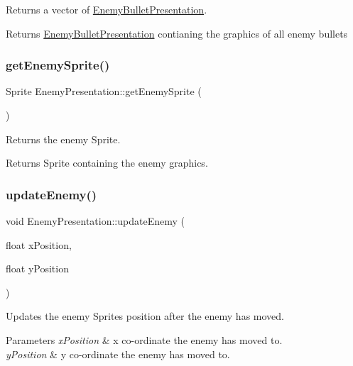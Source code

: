 Returns a vector of \hyperlink{class_enemy_bullet_presentation}{Enemy\+Bullet\+Presentation}. 

\begin{DoxyReturn}{Returns}
\hyperlink{class_enemy_bullet_presentation}{Enemy\+Bullet\+Presentation} contianing the graphics of all enemy bullets 
\end{DoxyReturn}
\mbox{\label{class_enemy_presentation_a9b88f3f215f5f94028f732005c68daa9}} 
\subsubsection{\texorpdfstring{get\+Enemy\+Sprite()}{getEnemySprite()}}
{\footnotesize\ttfamily Sprite Enemy\+Presentation\+::get\+Enemy\+Sprite (\begin{DoxyParamCaption}{ }\end{DoxyParamCaption})}



Returns the enemy Sprite. 

\begin{DoxyReturn}{Returns}
Sprite containing the enemy graphics. 
\end{DoxyReturn}
\mbox{\label{class_enemy_presentation_adc38a8f56b24ec4aea9157dd74884b40}} 
\subsubsection{\texorpdfstring{update\+Enemy()}{updateEnemy()}}
{\footnotesize\ttfamily void Enemy\+Presentation\+::update\+Enemy (\begin{DoxyParamCaption}\item[{float}]{x\+Position,  }\item[{float}]{y\+Position }\end{DoxyParamCaption})}



Updates the enemy Sprite\textquotesingle{}s position after the enemy has moved. 


\begin{DoxyParams}{Parameters}
{\em x\+Position} & x co-\/ordinate the enemy has moved to. \\
\hline
{\em y\+Position} & y co-\/ordinate the enemy has moved to. \\
\hline
\end{DoxyParams}
\mbox{\label{class_enemy_presentation_ad7d1f196be857ea51b2ced17b5199b40}} 
